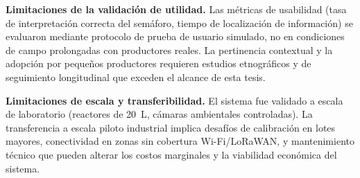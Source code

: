 \textbf{Limitaciones de la validación de utilidad.} Las métricas de usabilidad (tasa de interpretación correcta del semáforo, tiempo de localización de información) se evaluaron mediante protocolo de prueba de usuario simulado, no en condiciones de campo prolongadas con productores reales. La pertinencia contextual y la adopción por pequeños productores requieren estudios etnográficos y de seguimiento longitudinal que exceden el alcance de esta tesis.

\textbf{Limitaciones de escala y transferibilidad.} El sistema fue validado a escala de laboratorio (reactores de 20~L, cámaras ambientales controladas). La transferencia a escala piloto industrial implica desafíos de calibración en lotes mayores, conectividad en zonas sin cobertura Wi-Fi/LoRaWAN, y mantenimiento técnico que pueden alterar los costos marginales y la viabilidad económica del sistema.
